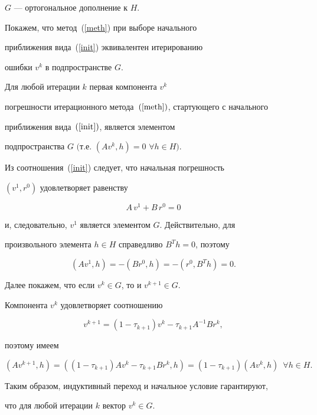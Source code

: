 $G$ --- ортогональное дополнение к $H$.


Покажем, что метод~(\ref{meth}) при выборе начального


приближения вида~(\ref{init}) эквивалентен итерированию


ошибки $v^k$ в подпространстве $G$.





\begin{lem} Для любой итерации $k$ первая компонента $v^k$


погрешности итерационного метода~$(\ref{meth})$, стартующего с начального


приближения вида~$(\ref{init})$, является элементом


подпространства $G$ $($т.е. $(Av^k,h)=0$ $\forall h \in H)$.


\end{lem}





\begin{pf} Из соотношения~(\ref{init}) следует, что начальная погрешность


$(v^1,r^0)$ удовлетворяет равенству


$$


A\,v^1 + B\,r^0 = 0


$$


и, следовательно, $v^1$ является элементом $G$. Действительно, для


произвольного элемента $h \in H$ справедливо $ B^Th=0$, поэтому


$$


(Av^1,h)=-(Br^0,h)=-(r^0,B^Th)=0.


$$


Далее покажем, что если $v^k \in G$, то и $v^{k+1} \in G$.


Компонента $v^k$ удовлетворяет соотношению


$$


v^{k+1} = (1-\tau_{k+1})v^k - \tau_{k+1} A^{-1}Br^k,


$$


поэтому имеем


$$


(Av^{k+1},h)=\left( (1-\tau_{k+1})Av^k - \tau_{k+1} Br^k, h \right) =


(1-\tau_{k+1})(Av^k,h)\ \; \forall h \in H. 


$$


Таким образом, индуктивный переход и начальное условие гарантируют,


что для любой итерации $k$ вектор $v^k \in G$.


\end{pf}





